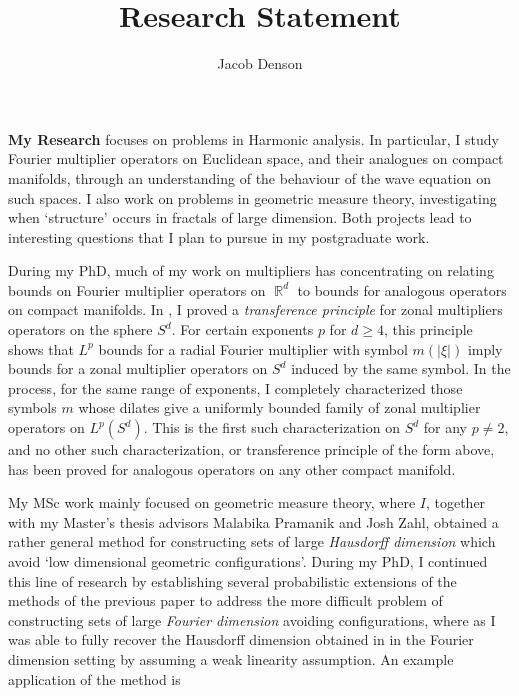 \documentclass[12pt]{article}
\title{Research Statement}
\author{Jacob Denson}
\date{}
\DeclareMathOperator{\RR}{\mathbb{R}}
\begin{document}
\maketitle

{\bf My Research} focuses on problems in Harmonic analysis. In particular, I study Fourier multiplier operators on Euclidean space, and their analogues on compact manifolds, through an understanding of the behaviour of the wave equation on such spaces. I also work on problems in geometric measure theory, investigating when `structure' occurs in fractals of large dimension. Both projects lead to interesting questions that I plan to pursue in my postgraduate work.

During my PhD, much of my work on multipliers has concentrating on relating bounds on Fourier multiplier operators on $\RR^d$ to bounds for analogous operators on compact manifolds. In \cite{DensonCharacterization}, I proved a \emph{transference principle} for zonal multipliers operators on the sphere $S^d$. For certain exponents $p$ for $d \geq 4$, this principle shows that $L^p$ bounds for a radial Fourier multiplier with symbol $m(|\xi|)$ imply bounds for a zonal multiplier operators on $S^d$ induced by the same symbol. In the process, for the same range of exponents, I completely characterized those symbols $m$ whose dilates give a uniformly bounded family of zonal multiplier operators on $L^p(S^d)$. This is the first such characterization on $S^d$ for any $p \neq 2$, and no other such characterization, or transference principle of the form above, has been proved for analogous operators on any other compact manifold.

My MSc work mainly focused on geometric measure theory, where $I$, together with my Master's thesis advisors Malabika Pramanik and Josh Zahl, obtained a rather general method \cite{DensonPramanikZahl} for constructing sets of large \emph{Hausdorff dimension} which avoid `low dimensional geometric configurations'. During my PhD, I continued this line of research by establishing several probabilistic extensions of the methods of the previous paper \cite{DensonFourier} to address the more difficult problem of constructing sets of large \emph{Fourier dimension} avoiding configurations, where as I was able to fully recover the Hausdorff dimension obtained in \cite{DensonPramanikZahl} in the Fourier dimension setting by assuming a weak linearity assumption. An example application of the method is 

%
%
\end{document}
